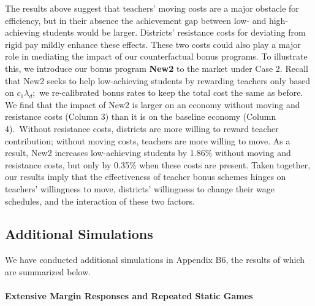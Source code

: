 \documentclass[notitlepage,12pt]{article}%
\begin{document}
The results above suggest that teachers' moving costs are a major obstacle for
efficiency, but in their absence the achievement gap between low- and
high-achieving students would be larger. Districts' resistance costs for
deviating from rigid pay mildly enhance these effects. These two costs could
also play a major role in mediating the impact of our counterfactual bonus
programs. To illustrate this, we introduce our bonus program \textbf{New2} to
the market under Case 2. Recall that New2 seeks to help low-achieving students
by rewarding teachers only based on $c_{1}\lambda_{d};$ we re-calibrated bonus
rates to keep the total cost the same as before. We find that the impact of
New2 is larger on an economy without moving and resistance costs (Column 3)
than it is on the baseline economy (Column 4).\ Without resistance costs,
districts are more willing to reward teacher contribution; without moving
costs, teachers are more willing to move. As a result, New2 increases
low-achieving students by 1.86\% without moving and resistance costs, but only
by 0.35\% when these costs are present. Taken together, our results imply that
the effectiveness of teacher bonus schemes hinges on teachers' willingness to
move, districts' willingness to change their wage schedules, and the
interaction of these two factors.

\subsection{Additional Simulations}

We have conducted additional simulations in Appendix B6, the results of
which are summarized below.

\paragraph{Extensive Margin Responses and Repeated Static Games}
\end{document}
